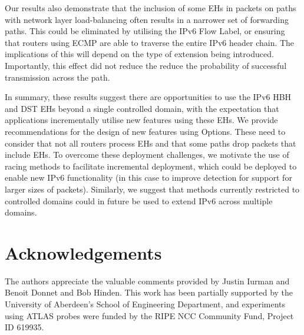 \documentclass[conference]{IEEEtran}
\begin{document}
Our results also
demonstrate that the inclusion of some EHs in packets on paths with network layer load-balancing often results in a narrower set of forwarding paths. 
This  could be eliminated by utilising the IPv6 Flow Label, or ensuring that routers using ECMP are able to traverse the entire IPv6 header chain. The implications of this will depend on the type of extension being introduced. Importantly, this effect did not reduce the reduce the probability of successful transmission across the path.

In summary, these results suggest there are  opportunities to use the IPv6 HBH and DST EHs beyond a single controlled domain, with the expectation that applications incrementally utilise new features using these EHs. We  provide recommendations for the design of new features using Options. These need to consider that not all routers process EHs and that some paths drop packets that include EHs. To overcome these deployment challenges, we motivate the use of racing methods to facilitate incremental deployment, which could be deployed to enable new IPv6 functionality (in this case to improve detection for support for larger sizes of packets). Similarly, we suggest that methods currently restricted to controlled domains could in future be used to extend IPv6 across multiple domains.

\section*{Acknowledgements}

The authors appreciate the valuable comments provided by Justin Iurman and Benoit Donnet and Bob Hinden. This work has been partially supported by the University of Aberdeen's School of Engineering Department, and experiments using ATLAS probes were funded by the RIPE
NCC Community Fund, Project ID 619935.


\small

\end{document}
